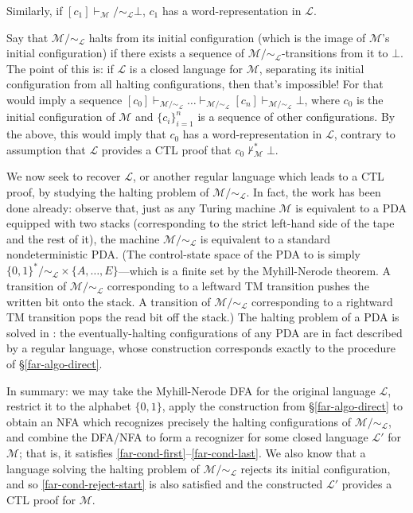 Similarly, if $[c_1]\vdash_\mathcal{M}/\sim_\mathcal{L}\bot$, $c_1$ has a word-representation in $\mathcal{L}$.

Say that $\mathcal{M}/\sim_\mathcal{L}$ halts from its initial configuration (which is the image of $\mathcal{M}$'s initial configuration) if there exists a sequence of $\mathcal{M}/\sim_\mathcal{L}$-transitions from it to $\bot$.
The point of this is: if $\mathcal{L}$ is a closed language for $\mathcal{M}$, separating its initial configuration from all halting configurations, then that's impossible!
For that would imply a sequence $[c_0]\vdash_{\mathcal{M}/\sim_\mathcal{L}}\dots\vdash_{\mathcal{M}/\sim_\mathcal{L}}[c_n]\vdash_{\mathcal{M}/\sim_\mathcal{L}}\bot$, where $c_0$ is the initial configuration of $\mathcal{M}$ and $\{c_i\}_{i=1}^n$ is a sequence of other configurations.
By the above, this would imply that $c_0$ has a word-representation in $\mathcal{L}$, contrary to assumption that $\mathcal{L}$ provides a CTL proof that $c_0\not\vdash^*_\mathcal{M}\bot$.

We now seek to recover $\mathcal{L}$, or another regular language which leads to a CTL proof, by studying the halting problem of $\mathcal{M}/\sim_\mathcal{L}$.
In fact, the work has been done already: observe that, just as any Turing machine $\mathcal{M}$ is equivalent to a PDA equipped with two stacks (corresponding to the strict left-hand side of the tape and the rest of it), the machine $\mathcal{M}/\sim_\mathcal{L}$ is equivalent to a  standard nondeterministic PDA. (The control-state space of the PDA to is simply $\{0,1\}^*/\sim_\mathcal{L} \times \{A,\ldots,E\}$---which is a finite set by the Myhill-Nerode theorem. A transition of $\mathcal{M}/\sim_\mathcal{L}$ corresponding to a leftward TM transition pushes the written bit onto the stack. A transition of $\mathcal{M}/\sim_\mathcal{L}$ corresponding to a rightward TM transition pops the read bit off the stack.)
The halting problem of a PDA is solved in  \cite{BEM_1997}: the eventually-halting configurations of any PDA are in fact described by a regular language, whose construction corresponds exactly to the procedure of \S\ref{far-algo-direct}.

In summary: we may take the Myhill-Nerode DFA for the original language $\mathcal{L}$, restrict it to the alphabet $\{0,1\}$, apply the construction from \S\ref{far-algo-direct} to obtain an NFA which recognizes precisely the halting configurations of $\mathcal{M}/\sim_\mathcal{L}$, and combine the DFA/NFA to form a recognizer for some closed language $\mathcal{L}'$ for $\mathcal{M}$; that is, it satisfies \eqref{far-cond-first}--\eqref{far-cond-last}. We also know that a language solving the halting problem of $\mathcal{M}/\sim_\mathcal{L}$ rejects its initial configuration, and so \eqref{far-cond-reject-start} is also satisfied and the constructed $\mathcal{L}'$ provides a CTL proof for $\mathcal{M}$.

